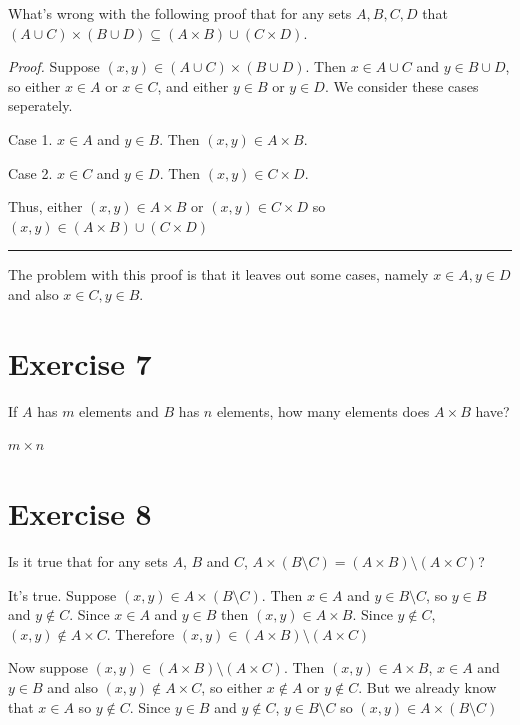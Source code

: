 \documentclass[11pt]{article}
\begin{document}
What's wrong with the following proof that for any sets $A, B, C, D$ that 
$(A \cup C) \times (B \cup D) \subseteq (A \times B) \cup (C \times D)$.

\textit{Proof.} Suppose $(x,y) \in (A \cup C) \times (B \cup D)$. Then 
$x \in A \cup C$ and $y \in B \cup D$, so either $x \in A$ or $x \in C$, and 
either $y \in B$ or $y \in D$. We consider these cases seperately.

Case 1. $x \in A$ and $y \in B$. Then $(x, y) \in A \times B$.

Case 2. $x \in C$ and $y \in D$. Then $(x, y) \in C \times D$.

Thus, either $(x, y) \in A \times B$ or $(x, y) \in C \times D$ so 
$(x, y) \in (A \times B) \cup (C \times D)$

\vspace{5pt}
\hrule 
\vspace{5pt}

The problem with this proof is that it leaves out some cases, namely $x \in A, 
y \in D$ and also $x \in C, y \in B$.

\section*{Exercise 7}

If $A$ has $m$ elements and $B$ has $n$ elements, how many elements does 
$A \times B$ have?

$m \times n$

\section*{Exercise 8}

Is it true that for any sets $A$, $B$ and $C$, 
$A \times (B \setminus C) = (A \times B) \setminus (A \times C)$?

It's true. Suppose $(x, y) \in A \times (B \setminus C)$. Then $x \in A$ and 
$y \in B \setminus C$, so $y \in B$ and $y \notin C$. Since $x \in A$ and $y \in B$
then $(x, y) \in A \times B$. Since $y \notin C$, $(x, y) \notin A \times C$.
Therefore $(x, y) \in (A \times B) \setminus (A \times C)$

Now suppose $(x, y) \in (A \times B) \setminus (A \times C)$. Then 
$(x, y) \in A \times B$, $x \in A$ and $y \in B$ and also 
$(x, y) \notin A \times C$, so either $x \notin A$ or $y \notin C$. But we already 
know that $x \in A$ so $y \notin C$. Since $y \in B$ and $y \notin C$, 
$y \in B \setminus C$ so $(x, y) \in A \times (B \setminus C)$
\end{document}
